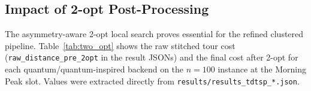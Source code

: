 \documentclass[conference]{IEEEtran}
\begin{document}


\subsection{Impact of 2-opt Post-Processing}

The asymmetry-aware 2-opt local search proves essential for the refined clustered pipeline. Table~\ref{tab:two_opt} shows the raw stitched tour cost (\texttt{raw\_distance\_pre\_2opt} in the result JSONs) and the final cost after 2-opt for each quantum/quantum-inspired backend on the $n=100$ instance at the Morning Peak slot. Values were extracted directly from \texttt{results/results\_tdtsp\_*.json}.
\end{document}
